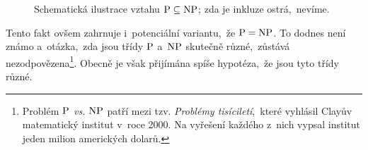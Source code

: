 \begin{figure}[ht]
    \centering
    
    \caption{Schematická ilustrace vztahu $\operatorname{P}\subseteq\operatorname{NP}$; zda je inkluze ostrá,~nevíme.}
    \label{fig:vztah_p_np}
\end{figure}
Tento fakt ovšem zahrnuje i~potenciální variantu,~že $\operatorname{P}=\operatorname{NP}$. To dodnes není známo a~otázka,~zda jsou třídy \ensuremath{\classP} a~\ensuremath{\classNP} skutečně různé,~zůstává nezodpovězena\footnote{Problém \emph{\ensuremath{\classP} vs. \ensuremath{\classNP}} patří mezi tzv. \emph{Problémy tisíciletí},~které vyhlásil Clayův matematický institut v~roce 2000. Na vyřešení každého z~nich vypsal institut jeden milion amerických dolarů.}. Obecně je však přijímána spíše hypotéza,~že jsou tyto třídy různé.

